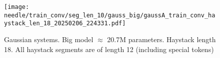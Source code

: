 \begin{figure}[h]
    \centering
    \texttt{[image: needle/train\_conv/seg\_len\_10/gauss\_big/gaussA\_train\_conv\_haystack\_len\_18\_20250206\_224331.pdf]}
    \caption{Gaussian systems. Big model $\approx$ 20.7M parameters. Haystack length 18. All haystack segments are of length 12 (including special tokens)}
    \label{fig:gauss_small_needle_train_conv_haystack_len_18_all_haystack_len_12}

\end{figure}






